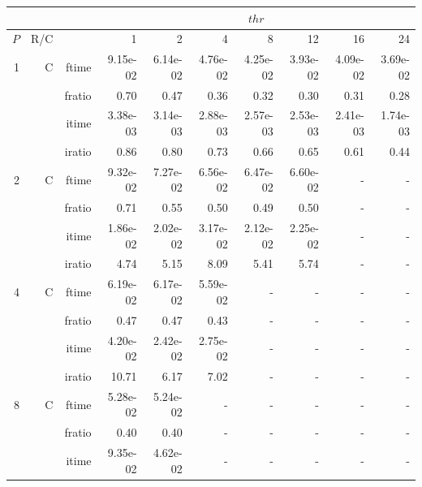 \documentclass[a4paper]{article}
\begin{document}
\begin{table}[htbp]
\begin{center}
\begin{small}
\begin{tabular}{|r|r|r|r|r|r|r|r|r|r|}
\hline 
     & & & \multicolumn{7}{c|}{$thr$} \\ \hline
    $P$ & R/C &  & 1           & 2    & 4    & 8    & 12   & 16    & 24  \\ \hline\hline
     1 & C & ftime & 9.15e-02 & 6.14e-02 & 4.76e-02 & 4.25e-02 & 3.93e-02 & 4.09e-02 & 3.69e-02 \\   
          &      & fratio & 0.70 & 0.47 & 0.36 & 0.32 & 0.30 & 0.31 & 0.28 \\   
          &      & itime & 3.38e-03 & 3.14e-03 & 2.88e-03 & 2.57e-03 & 2.53e-03 & 2.41e-03 & 1.74e-03 \\   
          &      & iratio & 0.86 & 0.80 & 0.73 & 0.66 & 0.65 & 0.61 & 0.44 \\ \hline 
     2 & C & ftime & 9.32e-02 & 7.27e-02 & 6.56e-02 & 6.47e-02 & 6.60e-02 &     -     &     -     \\   
          &      & fratio & 0.71 & 0.55 & 0.50 & 0.49 & 0.50 &     -     &     -     \\   
          &      & itime & 1.86e-02 & 2.02e-02 & 3.17e-02 & 2.12e-02 & 2.25e-02 &     -     &     -     \\   
          &      & iratio & 4.74 & 5.15 & 8.09 & 5.41 & 5.74 &     -     &     -     \\ \hline 
     4 & C & ftime & 6.19e-02 & 6.17e-02 & 5.59e-02 &     -     &     -     &     -     &     -     \\   
          &      & fratio & 0.47 & 0.47 & 0.43 &     -     &     -     &     -     &     -     \\   
          &      & itime & 4.20e-02 & 2.42e-02 & 2.75e-02 &     -     &     -     &     -     &     -     \\   
          &      & iratio & 10.71 & 6.17 & 7.02 &     -     &     -     &     -     &     -     \\ \hline 
     8 & C & ftime & 5.28e-02 & 5.24e-02 &     -     &     -     &     -     &     -     &     -     \\   
          &      & fratio & 0.40 & 0.40 &     -     &     -     &     -     &     -     &     -     \\   
          &      & itime & 9.35e-02 & 4.62e-02 &     -     &     -     &     -     &     -     &     -     \\   

\end{tabular}
\end{small}
\end{center}
\end{table}
\end{document}
